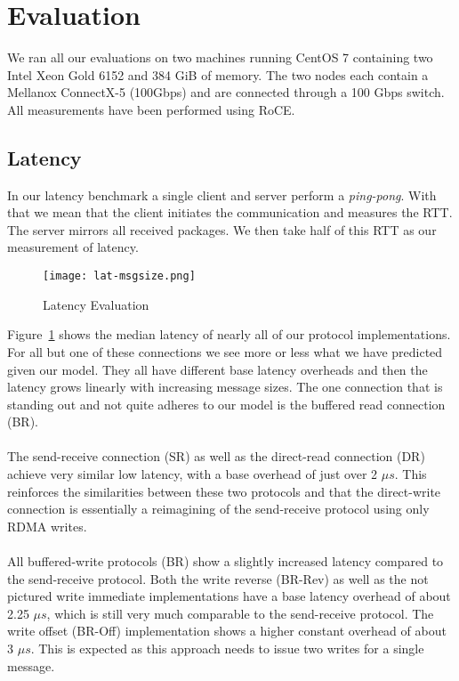 \section{Evaluation}

We ran all our evaluations on two machines running CentOS 7 containing two Intel Xeon Gold 6152 and 384 GiB of memory.
The two nodes each contain a Mellanox ConnectX-5 (100Gbps) and are connected through a 100 Gbps switch. All measurements
have been performed using RoCE.

\subsection{Latency}

 In our latency benchmark a single client and server perform a \emph{ping-pong}. With that 
we mean that the client initiates the communication and measures the RTT. The server mirrors all received packages. 
We then take half of this RTT as our measurement of latency.

\begin{figure}[h]
\texttt{[image: lat-msgsize.png]}
\caption{Latency Evaluation}
\label{fig:plot-lat}
\end{figure}


Figure~\ref{fig:plot-lat} shows the median latency of nearly all of our protocol implementations. For all but one of these 
connections we see more or less what we have predicted given our model. They all have different base latency overheads
and then the latency grows linearly with increasing message sizes. The one connection that is standing out
and not quite adheres to our model is the buffered read connection (BR).

\paragraph{} The send-receive connection (SR) as well as the direct-read connection (DR) achieve very similar low latency,
with a base overhead of just over 2 $\mu s$. This reinforces the similarities between these two protocols and that the 
direct-write connection is essentially a reimagining of the send-receive protocol using only RDMA writes.



\paragraph{} All buffered-write protocols (BR) show a slightly increased latency compared to the send-receive protocol.
Both the write reverse (BR-Rev) as well as the not pictured write immediate implementations have a base latency overhead 
of about 2.25 $\mu s$, which is still very much comparable to the send-receive protocol. The write offset 
(BR-Off) implementation shows a higher constant overhead of about 3 $\mu s$. This is expected as this approach needs to 
issue two writes for a single message.


